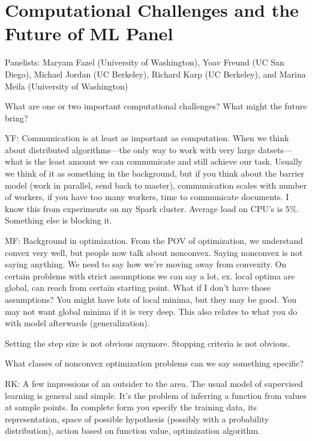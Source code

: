 \section{Computational Challenges and the Future of ML Panel}

Panelists: Maryam Fazel (University of Washington), Yoav Freund (UC San Diego), Michael Jordan (UC Berkeley), Richard Karp (UC Berkeley), and Marina Meila (University of Washington)

What are one or two important computational challenges? What might the future bring?

YF: Communication is at least as important as computation. When we think about distributed algorithms---the only way to work with very large datsets---what is the least amount we can communicate and still achieve our task. Usually we think of it as something in the background, but if you think about the barrier model (work in parallel, send back to master), communication scales with number of workers, if you have too many workers, time to communicate documents. I know this from experiments on my Spark cluster. Average load on CPU's is 5\%. Something else is blocking it.

MF: Background in optimization. From the POV of optimization, we understand convex very well, but people now talk about nonconvex. Saying nonconvex is not saying anything. We need to say how we're moving away from convexity. On certain problems with strict assumptions we can say a lot, ex. local optima are global, can reach from certain starting point. What if I don't have those assumptions? You might have lots of local minima, but they may be good. You may not want global minima if it is very deep. This also relates to what you do with model afterwards (generalization).

Setting the step size is not obvious anymore. Stopping criteria is not obvious.

What classes of nonconvex optimization problems can we say something specific?

RK: A few impressions of an outsider to the area. The usual model of supervised learning is general and simple. It's the problem of inferring a function from values at sample points. In complete form you specify the training data, its representation, space of possible hypothesis (possibly with a probability distribution), action based on function value, optimization algorithm. 

